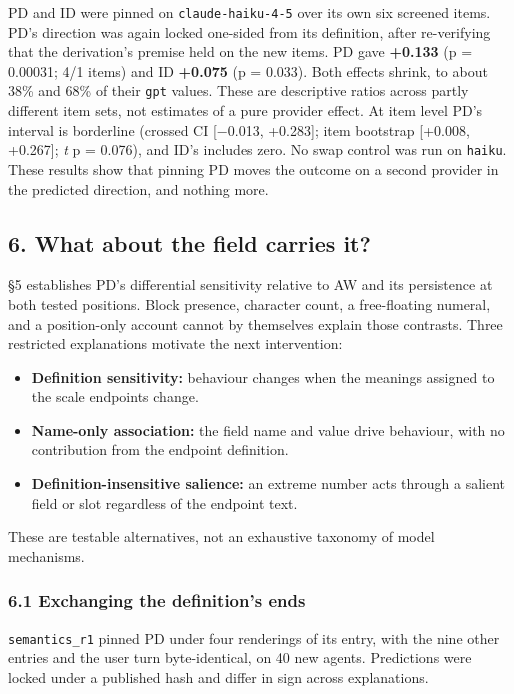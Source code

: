 \documentclass[
  11pt]{article}
\providecommand{\tightlist}{%
  \setlength{\itemsep}{0pt}\setlength{\parskip}{0pt}}
\begin{document}
PD and ID were pinned on \texttt{claude-haiku-4-5} over its own six
screened items. PD's direction was again locked one-sided from its
definition, after re-verifying that the derivation's premise held on the
new items. PD gave \textbf{+0.133} (p = 0.00031; 4/1 items) and ID
\textbf{+0.075} (p = 0.033). Both effects shrink, to about 38\% and 68\%
of their \texttt{gpt} values. These are descriptive ratios across partly
different item sets, not estimates of a pure provider effect. At item
level PD's interval is borderline (crossed CI {[}−0.013, +0.283{]}; item
bootstrap {[}+0.008, +0.267{]}; \emph{t} p = 0.076), and ID's includes
zero. No swap control was run on \texttt{haiku}. These results show that
pinning PD moves the outcome on a second provider in the predicted
direction, and nothing more.

\subsection{6. What about the field carries
it?}\label{what-about-the-field-carries-it}

§5 establishes PD's differential sensitivity relative to AW and its
persistence at both tested positions. Block presence, character count, a
free-floating numeral, and a position-only account cannot by themselves
explain those contrasts. Three restricted explanations motivate the next
intervention:

\begin{itemize}
\tightlist
\item
  \textbf{Definition sensitivity:} behaviour changes when the meanings
  assigned to the scale endpoints change.
\item
  \textbf{Name-only association:} the field name and value drive
  behaviour, with no contribution from the endpoint definition.
\item
  \textbf{Definition-insensitive salience:} an extreme number acts
  through a salient field or slot regardless of the endpoint text.
\end{itemize}

These are testable alternatives, not an exhaustive taxonomy of model
mechanisms.

\subsubsection{6.1 Exchanging the definition's
ends}\label{exchanging-the-definitions-ends}

\texttt{semantics\_r1} pinned PD under four renderings of its entry,
with the nine other entries and the user turn byte-identical, on 40 new
agents. Predictions were locked under a published hash and differ in
sign across explanations.
\end{document}
